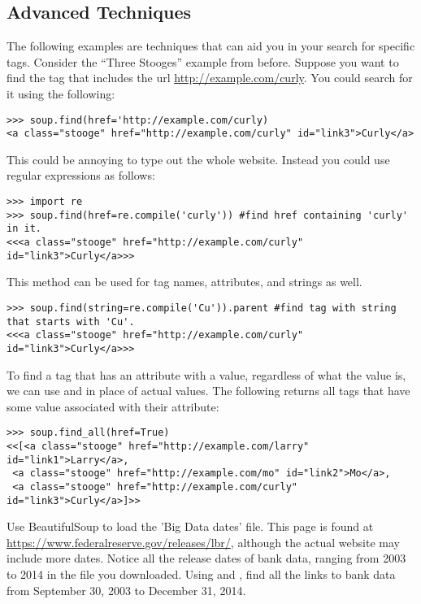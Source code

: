 \subsection*{Advanced Techniques}
The following examples are techniques that can aid you in your search for specific tags.
Consider the ``Three Stooges'' example from before.
Suppose you want to find the tag that includes the url \url{http://example.com/curly}.
You could search for it using the following:
\begin{lstlisting}
>>> soup.find(href='http://example.com/curly)
<a class="stooge" href="http://example.com/curly" id="link3">Curly</a>
\end{lstlisting}
This could be annoying to type out the whole website.
Instead you could use regular expressions as follows:
\begin{lstlisting}
>>> import re
>>> soup.find(href=re.compile('curly')) #find href containing 'curly' in it.
<<<a class="stooge" href="http://example.com/curly" id="link3">Curly</a>>>
\end{lstlisting}
This method can be used for tag names, attributes, and strings as well.
\begin{lstlisting}
>>> soup.find(string=re.compile('Cu')).parent #find tag with string that starts with 'Cu'.
<<<a class="stooge" href="http://example.com/curly" id="link3">Curly</a>>>
\end{lstlisting}

To find a tag that has an attribute with a value, regardless of what the value is, we can use  and  in place of actual values.
The following returns all tags that have some value associated with their  attribute:
\begin{lstlisting}
>>> soup.find_all(href=True)
<<[<a class="stooge" href="http://example.com/larry" id="link1">Larry</a>,
 <a class="stooge" href="http://example.com/mo" id="link2">Mo</a>,
 <a class="stooge" href="http://example.com/curly" id="link3">Curly</a>]>>
\end{lstlisting}

\begin{problem}

Use BeautifulSoup to load the 'Big Data dates' file.
This page is found at \url{https://www.federalreserve.gov/releases/lbr/}, although the actual website may include more dates.
Notice all the release dates of bank data, ranging from 2003 to 2014 in the file you downloaded.
Using  and , find all the links to bank data from September 30, 2003 to December 31, 2014.

\end{problem}